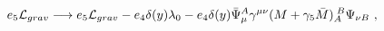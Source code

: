 \begin{equation} 
   e_5 {\cal L}_{grav}\longrightarrow  e_5 {\cal L}_{grav}- e_4\delta(y)\lambda_0- e_4\delta(y)\bar{\Psi}_\mu^A\gamma^{\mu\nu}(M+\gamma_5\bar{M})_{A}^{\;B} \Psi_{\nu B} \ ,
   \end{equation} 
